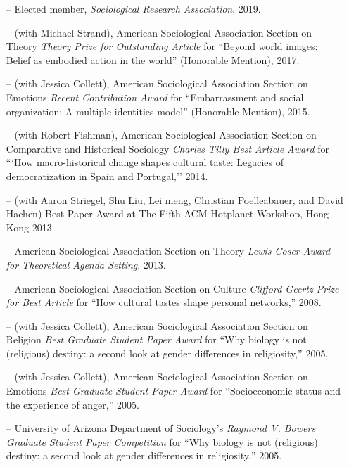 \begin{itemize}[itemsep=0.5ex]
    
\item[--] Elected member, {\em Sociological Research Association}, 2019. 

\item[--] (with Michael Strand), American Sociological Association Section on Theory {\em Theory Prize for Outstanding Article} for ``Beyond world images: Belief as embodied action in the world'' (Honorable Mention), 2017.

\item[--] (with Jessica Collett), American Sociological Association Section on Emotions {\em Recent Contribution Award} for ``Embarrassment and social organization: A multiple identities model'' (Honorable Mention), 2015.

\item[--] (with Robert Fishman), American Sociological Association Section on Comparative and Historical Sociology {\em Charles Tilly Best Article Award} for ```How macro-historical change shapes cultural taste: Legacies of democratization in Spain and Portugal,'' 2014.

\item[--] (with Aaron Striegel, Shu Liu, Lei meng, Christian Poelleabauer, and David Hachen) Best Paper Award at The Fifth ACM Hotplanet Workshop, Hong Kong 2013.

\item[--] American Sociological Association Section on Theory {\em Lewis Coser Award for Theoretical Agenda Setting}, 2013.

\item[--] American Sociological Association Section on Culture  {\em Clifford Geertz Prize for Best Article} for ``How cultural tastes shape personal networks,'' 2008.

\item[--] (with Jessica Collett), American Sociological Association Section on Religion  {\em Best Graduate Student Paper Award} for ``Why biology is not (religious) destiny: a second look at gender differences in religiosity,''   2005.

\item[--] (with Jessica Collett), American Sociological Association Section on Emotions  {\em Best Graduate Student Paper Award} for ``Socioeconomic status and the experience of anger,'' 2005.

\item[--] University of Arizona Department of Sociology's  {\em Raymond V. Bowers Graduate Student Paper Competition} for ``Why biology is not (religious) destiny: a second look at gender differences in religiosity,'' 2005.


\end{itemize}
